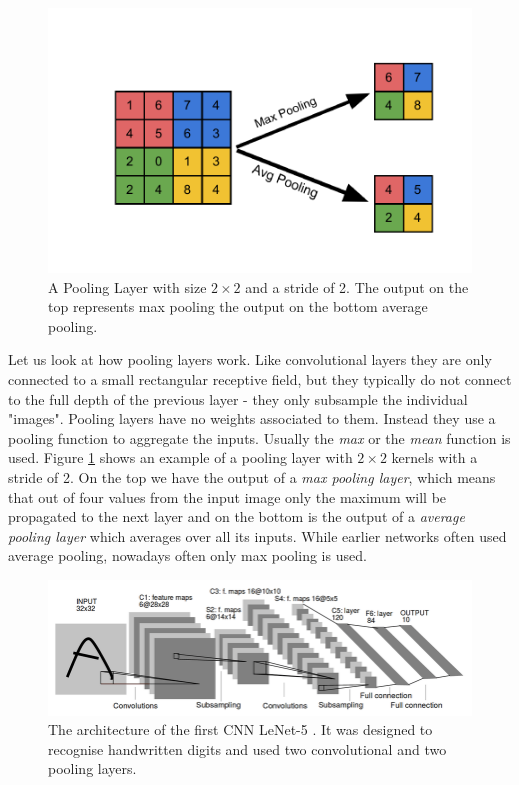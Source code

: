 \begin{figure}[ht]
    
  \begin{center}
      \includegraphics[clip, width=0.7\columnwidth]{figures/deeplearning/Pooling.pdf}
  \end{center}
  
  \caption[Pooling Layer]{A Pooling Layer with size $2 \times 2$ and a stride of 2. The output on the top represents max pooling the output on the bottom average pooling.}
  \label{fig:Pooling}
\end{figure}

Let us look at how pooling layers work. Like convolutional layers they are only connected to a small rectangular receptive field, but they typically do not connect to the full depth of the previous layer - they only subsample the individual "images". Pooling layers have no weights associated to them. Instead they use a pooling function to aggregate the inputs. Usually the \textit{max} or the \textit{mean} function is used. Figure \ref{fig:Pooling} shows an example of a pooling layer with $2 \times 2$ kernels with a stride of 2. On the top we have the output of a \textit{max pooling layer}, which means that out of four values from the input image only the maximum will be propagated to the next layer and on the bottom is the output of a \textit{average pooling layer} which averages over all its inputs. While earlier networks often used average pooling, nowadays often only max pooling is used. 

\begin{figure}[ht]
    
  \begin{center}
      \includegraphics[clip, width=0.7\columnwidth]{figures/deeplearning/LeNetArch.png}
  \end{center}
  
  \caption[LeNet-5 Architecture]{The architecture of the first CNN LeNet-5 \cite{lecun1998gradient}. It was designed to recognise handwritten digits and used two convolutional and two pooling layers.}
  \label{fig:LeNet}
\end{figure}

